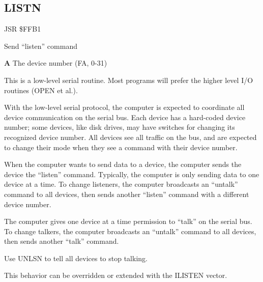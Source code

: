 \subsection{LISTN}
\label{KERNAL Jump Table!LISTN}
\begin{description}[leftmargin=2cm,style=nextline]
    \item [Address:] JSR \$FFB1
    \item [Description:] Send ``listen'' command
    \item [Inputs:]
        \textbf{A} The device number (FA, 0-31)
    \item [Remarks:]
        This is a low-level serial routine. Most programs will prefer the higher level I/O routines (OPEN et al.).

        With the low-level serial protocol, the computer is expected to coordinate all device communication on the serial bus. Each device has a hard-coded device number; some devices, like disk drives, may have switches for changing its recognized device number. All devices see all traffic on the bus, and are expected to change their mode when they see a command with their device number.

        When the computer wants to send data to a device, the computer sends the device the ``listen'' command. Typically, the computer is only sending data to one device at a time. To change listeners, the computer broadcasts an ``untalk'' command to all devices, then sends another ``listen'' command with a different device number.

        The computer gives one device at a time permission to ``talk'' on the serial bus. To change talkers, the computer broadcasts an ``untalk'' command to all devices, then sends another ``talk'' command.

        Use UNLSN to tell all devices to stop talking.

        This behavior can be overridden or extended with the ILISTEN vector.
    \item [Example:]
\end{description}



\newpage
